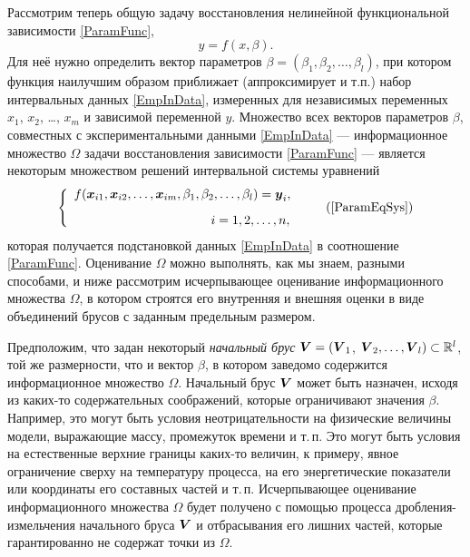 \documentclass[a5paper,openany]{book}
\newcommand{\mbf}[1]{\protect\text{\boldmath$#1$}}
\newcommand{\mbb}{\mathbb}
\begin{document}
Рассмотрим теперь общую задачу восстановления нелинейной функциональной зависимости 
\eqref{ParamFunc}, 
\begin{equation*}
y = f(x, \beta).  
\end{equation*}
Для неё нужно определить вектор параметров $\beta = (\beta_{1}, \beta_{2}, \ldots, 
\beta_{l})$, при котором функция наилучшим образом приближает (аппроксимирует и т.п.) 
набор интервальных данных \eqref{EmpInData}, измеренных для независимых переменных 
$x_1$, $x_2$, \ldots, $x_m$ и зависимой переменной $y$. Множество всех векторов 
параметров $\beta$, совместных с экспериментальными данными \eqref{EmpInData} --- 
информационное множество $\varOmega$ задачи восстановления зависимости \eqref{ParamFunc} 
--- является некоторым множеством решений интервальной системы уравнений 
\begin{equation*} 
\left\{ 
\begin{array}{l} 
f(\mbf{x}_{i1}, \mbf{x}_{i2}, \ldots, \mbf{x}_{im}, 
   \beta_{1}, \beta_{2}, \ldots, \beta_{l}) = \mbf{y}_{i}, \\[3mm] 
\hspace*{38mm} i = 1,2,\ldots,n, 
\end{array} 
\right. 
\tag{\ref{ParamEqSys}}  
\end{equation*} 
которая получается подстановкой данных \eqref{EmpInData} в соотношение 
\eqref{ParamFunc}. Оценивание $\varOmega$ можно выполнять, как мы знаем, разными 
способами, и ниже рассмотрим исчерпывающее оценивание информационного множества 
$\varOmega$, в котором строятся его внутренняя и внешняя оценки в виде объединений 
брусов с заданным предельным размером. 
  
Предположим, что задан некоторый \emph{начальный брус} $\mbf{V} = (\mbf{V}_{1}$, 
$\mbf{V}_{2}, \ldots, \mbf{V}_{l})\subset\mbb{R}^l$, той же размерности, что и 
вектор $\beta$, в котором заведомо содержится информационное множество $\varOmega$. 
Начальный брус $\mbf{V}$ может быть назначен, исходя из каких-то содержательных 
соображений, которые ограничивают значения $\beta$. Например, это могут быть 
условия неотрицательности на физические величины модели, выражающие массу, 
промежуток времени и т.\,п. Это могут быть условия на естественные верхние границы 
каких-то величин, к примеру, явное ограничение сверху на температуру процесса, 
на его энергетические показатели или координаты его составных частей и т.\,п. 
Исчерпывающее оценивание информационного множества $\varOmega$ будет получено 
с помощью процесса дробления-измельчения начального бруса $\mbf{V}$ и отбрасывания 
его лишних частей, которые гарантированно не содержат точки из $\varOmega$. 
  
\end{document}
